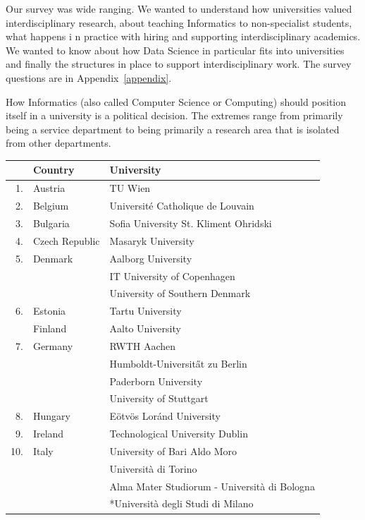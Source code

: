 \documentclass[11pt]{amsart}
\begin{document}
Our survey was wide ranging. We wanted to understand how universities valued interdisciplinary research, about teaching Informatics to non-specialist students, what happens i n practice with hiring and supporting interdisciplinary academics. We wanted to know about how Data Science in particular fits into universities and finally the structures in place to support interdisciplinary work. The survey questions are in Appendix~\ref{appendix}. 

How Informatics (also called Computer Science or Computing) should position itself in a university is a political decision. The extremes range from primarily being a service department to being primarily a research area that is isolated from other departments.


\begin{table}
\begin{center}
\begin{tabular}  {|r|l|l|}
\hline
&{\bf Country} & {\bf University}\\
\hline
1.&Austria   &  TU Wien\\
\hline
2.&Belgium   & Universit\' e Catholique de Louvain \\
\hline
3.&Bulgaria  &  Sofia University St. Kliment Ohridski\\
\hline
4.&Czech Republic & Masaryk University\\
\hline
5.&Denmark  &  Aalborg University\\
& &  IT University of Copenhagen \\
&  &  University of Southern Denmark\\
\hline
6.&Estonia   & Tartu University \\
\hline
&Finland  & Aalto University \\
\hline
7.&Germany  & RWTH Aachen \\
&  & Humboldt-Universit\H at zu Berlin \\
&  &  Paderborn University\\
&  & University of Stuttgart \\
\hline
8.&Hungary   &   E\" otv\"os Lor\'and University\\
\hline
9.&Ireland  &  Technological University Dublin\\
\hline
10.&Italy   & University of Bari Aldo Moro\\
 &  &  Universit\` a di Torino\\
 & & Alma Mater Studiorum - Università di Bologna \\
 & & *Universit\` a degli Studi di Milano \\

\end{tabular}
\end{center}
\end{table}
\end{document}
